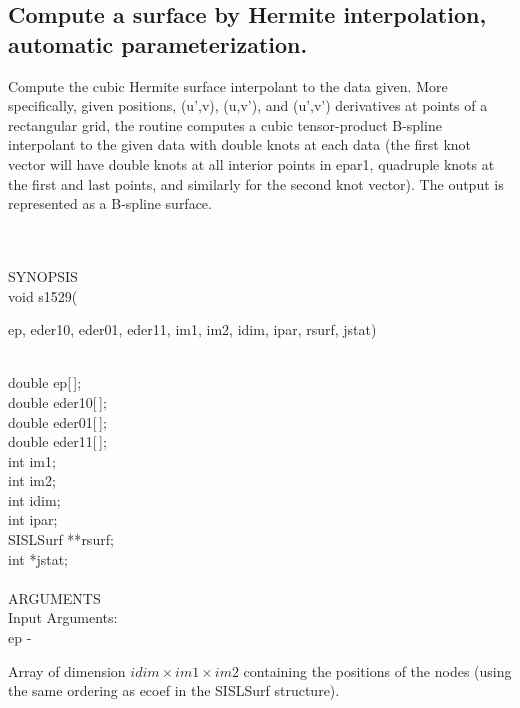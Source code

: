 \subsection{\sloppy Compute a surface by Hermite interpolation, automatic parameter\-ization.}
\begin{minipg1}
  Compute the cubic Hermite surface interpolant to the data given.
  More specifically, given positions, (u',v), (u,v'), and (u',v')
  derivatives at points of a rectangular grid,
  the routine
  computes a cubic tensor-product B-spline interpolant to
  the given data with double knots at each data (the first
  knot vector will have double knots at all interior points
  in epar1, quadruple knots at the first and last points,
  and similarly for the second knot vector).
  The output is represented as a B-spline surface.
\end{minipg1}\\ \\
SYNOPSIS\\
        \>void s1529(\begin{minipg3}
          {\fov ep}, {\fov eder10}, {\fov eder01}, {\fov eder11},
          {\fov im1}, {\fov im2}, {\fov idim}, {\fov ipar}, {\fov rsurf}, {\fov jstat})
        \end{minipg3}\\[0.3ex]
        \>\>    double \>  {\fov ep}[\,];\\
        \>\>    double \>  {\fov eder10}[\,];\\
        \>\>    double \>  {\fov eder01}[\,];\\
        \>\>    double \>  {\fov eder11}[\,];\\
        \>\>    int    \>  {\fov im1};\\
        \>\>    int    \>  {\fov im2};\\
        \>\>    int    \>  {\fov idim};\\
        \>\>    int    \>  {\fov ipar};\\
        \>\>    SISLSurf \>  **{\fov rsurf};\\
        \>\>    int    \>  *{\fov jstat};\\
\\
ARGUMENTS\\
        \>Input Arguments:\\
        \>\>    {\fov ep}     \> - \>
        \begin{minipg2}
          Array of dimension $idim\times im1\times im2$ containing the
          positions of the nodes (using the same ordering as ecoef in
          the SISLSurf structure).
        \end{minipg2}\\[0.8ex]
